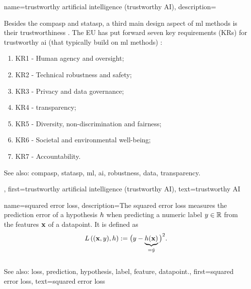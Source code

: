 {name={trustworthy artificial intelligence (trustworthy AI)},
	description={Besides the \gls{compasp} and \gls{statasp}, a third main design aspect of 
		\gls{ml} methods is their trustworthiness \cite{pfau2024engineeringtrustworthyaideveloper}. 
		The EU has put forward seven key requirements (KRs) for trustworthy 
		\gls{ai} (that typically build on \gls{ml} methods) \cite{ALTAIEU}: 
	\begin{enumerate}[label=\arabic*)]
		\item KR1 - Human agency and oversight;
		\item KR2 - Technical \gls{robustness} and safety;
		\item KR3 - Privacy and \gls{data} governance;
		\item KR4 - \Gls{transparency};
		\item KR5 - Diversity, non-discrimination and fairness; 
		\item KR6 - Societal and environmental well-being;
		\item KR7 - Accountability. 
	\end{enumerate}
		See also: \gls{compasp}, \gls{statasp}, \gls{ml}, \gls{ai}, \gls{robustness}, \gls{data}, \gls{transparency}.},
	first={trustworthy artificial intelligence (trustworthy AI)},
	text={trustworthy AI}
}

{name={squared error loss},
	description={The squared 
		error \gls{loss} measures the \gls{prediction} error of a 
		\gls{hypothesis} $h$ when predicting a numeric \gls{label} $y \in \mathbb{R}$ 
		from the \glspl{feature} ${\bf x}$ of a \gls{datapoint}. It is defined as 
\begin{equation} 
	\nonumber
	L\left(({\bf x},y),h \right) := \big(y - \underbrace{h({\bf x})}_{=\hat{y}} \big)^{2}. 
\end{equation} 
			\\ 
		See also: \gls{loss}, \gls{prediction}, \gls{hypothesis}, \gls{label}, \gls{feature}, \gls{datapoint}.},
	first={squared error loss},
	text={squared error loss}
}


